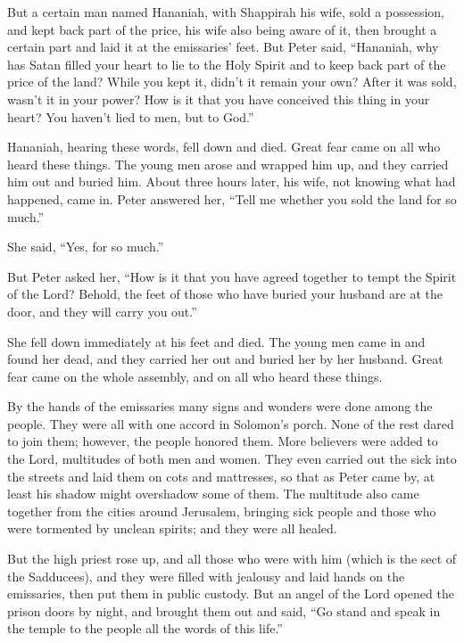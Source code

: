 \mychapter{} \myverse*{}But a certain man named Hananiah, with Shappirah his wife, sold
a possession,
\myverse{}and kept back part of the price, his wife also being aware of it, then brought
a certain part and laid it at the emissaries’ feet.
\myverse{}But Peter said, “Hananiah, why has Satan filled your heart to lie to the Holy
Spirit and to keep back part of the price of the land?
\myverse{}While you kept it, didn’t it remain your own? After it was sold, wasn’t it in
your power? How is it that you have conceived this thing in your heart? You haven’t lied to men, but to
God.”

\myverse{}Hananiah, hearing these words, fell down and died. Great fear came
on all who heard these things.
\myverse{}The young men arose and wrapped him up, and they carried him out and buried
him.
\myverse{}About three hours later, his wife, not knowing what had happened, came in.
\myverse{}Peter answered her, “Tell me whether you sold the land for so much.”

She said, “Yes, for so much.”

\myverse{}But Peter asked her, “How is it that you have agreed together to
tempt the Spirit of the Lord? Behold, the feet of those who have buried your husband are at the door,
and they will carry you out.”

\myverse{}She fell down immediately at his feet and died. The young men
came in and found her dead, and they carried her out and buried her by her husband.
\myverse{}Great fear came on the whole assembly, and on all who heard these things.

\myverse{}By the hands of the emissaries many signs and wonders were done
among the people. They were all with one accord in Solomon’s porch.
\myverse{}None of the rest dared to join them; however, the people honored them.
\myverse{}More believers were added to the Lord, multitudes of both men and women.
\myverse{}They even carried out the sick into the streets and laid them on cots and
mattresses, so that as Peter came by, at least his shadow might overshadow some of them.
\myverse{}The multitude also came together from the cities around Jerusalem, bringing
sick people and those who were tormented by unclean spirits; and they were all healed.

\myverse{}But the high priest rose up, and all those who were with him
(which is the sect of the Sadducees), and they were filled with jealousy
\myverse{}and laid hands on the emissaries, then put them in public custody.
\myverse{}But an angel of the Lord opened the prison doors by night, and brought them
out and said,
\myverse{}“Go stand and speak in the temple to the people all the words of this life.”

